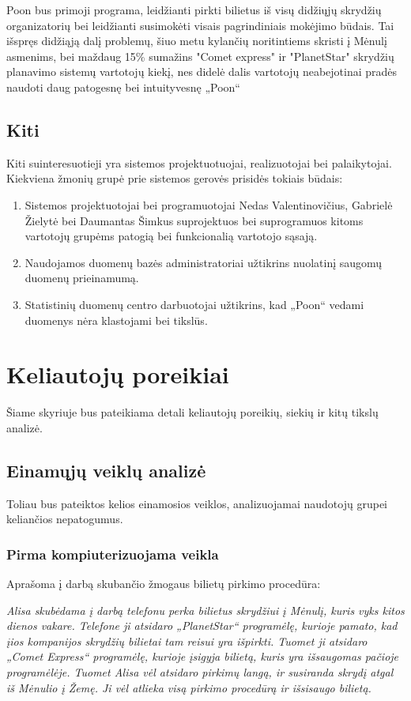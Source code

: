 \documentclass{VUMIFPSkursinis}
\begin{document}
Poon bus primoji programa, leidžianti pirkti bilietus iš visų didžiųjų skrydžių organizatorių bei leidžianti susimokėti visais pagrindiniais mokėjimo būdais. Tai išspręs didžiąją dalį problemų, šiuo metu kylančių noritintiems skristi į Mėnulį asmenims, bei maždaug 15\% sumažins "Comet express" ir "PlanetStar" skrydžių planavimo sistemų vartotojų kiekį, nes didelė dalis vartotojų neabejotinai pradės naudoti daug patogesnę bei intuityvesnę „Poon“

\subsection{Kiti}
Kiti suinteresuotieji yra sistemos projektuotuojai, realizuotojai bei palaikytojai. Kiekviena žmonių grupė prie sistemos gerovės prisidės tokiais būdais:
\begin{enumerate}
\item Sistemos projektuotojai bei programuotojai Nedas Valentinovičius, Gabrielė Žielytė bei Daumantas Šimkus suprojektuos bei suprogramuos kitoms vartotojų grupėms patogią bei funkcionalią vartotojo sąsają.
\item Naudojamos duomenų bazės administratoriai užtikrins nuolatinį saugomų duomenų prieinamumą.
\item Statistinių duomenų centro darbuotojai užtikrins, kad „Poon“ vedami duomenys nėra klastojami bei tikslūs.
\end{enumerate}

\section{Keliautojų poreikiai}
Šiame skyriuje bus pateikiama detali keliautojų poreikių, siekių ir kitų tikslų analizė.

\subsection{Einamųjų veiklų analizė}
Toliau bus pateiktos kelios einamosios veiklos, analizuojamai naudotojų grupei keliančios nepatogumus.

\subsubsection{Pirma kompiuterizuojama veikla}
Aprašoma į darbą skubančio žmogaus bilietų pirkimo procedūra: 

\bigskip
\textit{Alisa skubėdama į darbą telefonu perka bilietus skrydžiui į Mėnulį, kuris vyks kitos dienos vakare. Telefone ji atsidaro „PlanetStar“ programėlę, kurioje pamato, kad įios kompanijos skrydžių bilietai tam reisui yra išpirkti. Tuomet ji atsidaro „Comet Express“ programėlę, kurioje įsigyja bilietą, kuris yra išsaugomas pačioje programėlėje. Tuomet Alisa vėl atsidaro pirkimų langą, ir susiranda skrydį atgal iš Mėnulio į Žemę. Ji vėl atlieka visą pirkimo procedūrą ir išsisaugo bilietą.}
\end{document}
